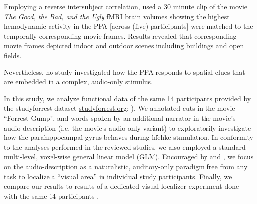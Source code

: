 \documentclass[english]{article}
\begin{document}
Employing a reverse intersubject correlation, \citep{hasson2004intersubject}
used a 30 minute clip of the movie \textit{The Good, the Bad, and the Ugly}
\citep{goodbadugly} fMRI brain volumes showing the highest hemodynamic activity
in the PPA [across (five) participants] were matched to the temporally
corresponding movie frames. Results revealed that corresponding movie frames
depicted indoor and outdoor scenes including buildings and open fields.

Nevertheless, no study investigated how the PPA responds to spatial clues that are embedded in a complex, audio-only stimulus.



In this study, we analyze functional data of the same 14 participants provided
by the studyforrest dataset \href{http://www.studyforrest.org}{studyforrest.org}; \citep{hanke2014audiomovie, hanke2016simultaneous}).
We annotated cuts in the movie ``Forrest Gump'', and words spoken by an
additional narrator in the movie's audio-description (i.e. the movie's
audio-only variant) to exploratorily investigate how the parahippocampal gyrus
behaves during lifelike stimulation.
In conformity to the analyses performed in the reviewed studies,  we also
employed a standard multi-level, voxel-wise general linear model
(GLM).
Encouraged by \citep{aziz2008modulation} and \citep{aminoff2013role}, we focus
on the audio-description as a naturalistic, auditory-only paradigm free from any task to localize a ``visual area'' in individual study participants.
Finally, we compare our results to results of a dedicated visual localizer
experiment done with the same 14 participants \citep{sengupta2016extension}.

\end{document}
